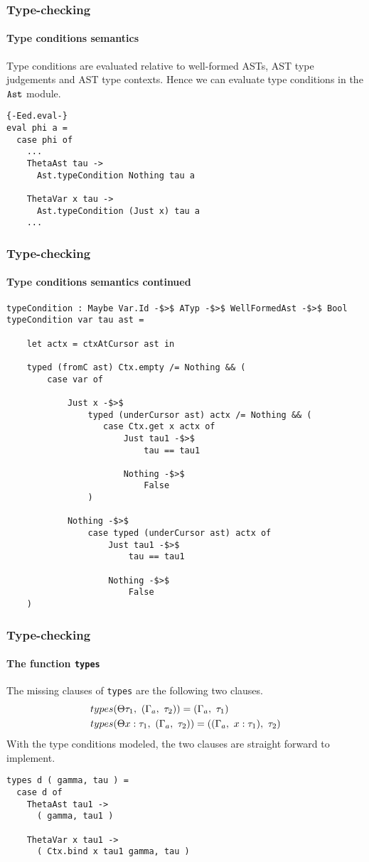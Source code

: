 \begin{frame}[fragile]
    \frametitle{Type-checking}
    \framesubtitle{Type conditions semantics}
    Type conditions are evaluated relative to well-formed ASTs, AST type
    judgements and AST type contexts. Hence we can evaluate type conditions in
    the $\texttt{Ast}$ module.
    \begin{lstlisting}
{-Eed.eval-}
eval phi a =
  case phi of
    ...
    ThetaAst tau ->
      Ast.typeCondition Nothing tau a

    ThetaVar x tau ->
      Ast.typeCondition (Just x) tau a
    ...
    \end{lstlisting}
\end{frame}

\begin{frame}[fragile]
    \frametitle{Type-checking}
    \framesubtitle{Type conditions semantics continued}
    \begin{lstlisting}[basicstyle=\tiny]
typeCondition : Maybe Var.Id -$>$ ATyp -$>$ WellFormedAst -$>$ Bool
typeCondition var tau ast =

    let actx = ctxAtCursor ast in
    
    typed (fromC ast) Ctx.empty /= Nothing && (
        case var of

            Just x -$>$
                typed (underCursor ast) actx /= Nothing && (
                   case Ctx.get x actx of
                       Just tau1 -$>$
                           tau == tau1

                       Nothing -$>$
                           False
                )

            Nothing -$>$
                case typed (underCursor ast) actx of
                    Just tau1 -$>$
                        tau == tau1

                    Nothing -$>$
                        False
    )
    \end{lstlisting}
\end{frame}

\begin{frame}[fragile]
  \frametitle{Type-checking}
  \framesubtitle{The function \texttt{types}}
  The missing clauses of \texttt{types} are the following two clauses.
  \begin{align*}
    &types(\Theta \tau_1,~(\Gamma_{a},~\tau_2)) = (\Gamma_{a},~\tau_1)\\
    &types(\Theta x : \tau_1,~(\Gamma_{a},~\tau_2)) = ((\Gamma_{a},~x : \tau_1),~\tau_2)
  \end{align*}
  \pause
  With the type conditions modeled, the two clauses are straight forward to
  implement. 
    \begin{lstlisting}
types d ( gamma, tau ) =
  case d of
    ThetaAst tau1 ->
      ( gamma, tau1 )

    ThetaVar x tau1 ->
      ( Ctx.bind x tau1 gamma, tau )
    \end{lstlisting}
\end{frame}

